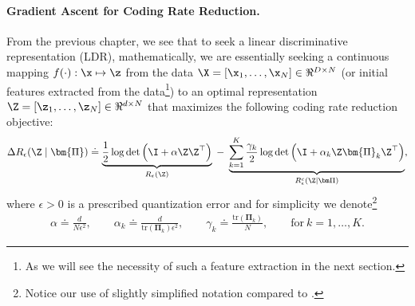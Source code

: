 \documentclass[../../book-main.tex]{subfiles}
\begin{document}
\paragraph{Gradient Ascent for Coding Rate Reduction.} From the previous chapter, we see that to seek a linear discriminative representation (LDR), mathematically, we are essentially seeking a continuous mapping $f(\cdot): \x \mapsto \z$ from the data $\X = [\x_1, \ldots, \x_N] \in \Re^{D \times N}$ (or initial features extracted from the data\footnote{As we will see the necessity of such a feature extraction in the next section.}) to an optimal representation $\Z = [\z_1, \ldots, \z_N] \in \Re^{d \times N}$ that maximizes the following coding rate reduction objective:
\begin{equation}\label{eq:mcr-formulation}
\begin{split}
\Delta R_{\epsilon}(\Z \mid \bm{\Pi}) \doteq \underbrace{\frac{1}{2}\log\det \Big(\I + {\alpha} \Z \Z^{\top} \Big)}_{R_{\epsilon}(\Z)} \;-\; \underbrace{\sum_{k=1}^{K}\frac{\gamma_{k}}{2} \log\det\Big(\I + {\alpha_{k}} \Z \bm{\Pi}_{k} \Z^{\top} \Big)}_{R_{\epsilon}^c(\Z \mid \bm \Pi)},
\end{split}
\end{equation}
where $\epsilon > 0$ is a prescribed quantization error and for simplicity we denote\footnote{Notice our use of slightly simplified notation compared to .}
\begin{align*}
    \alpha \doteq \frac{d}{N\epsilon^2}, \qquad \alpha_{k} \doteq \frac{d}{\mathrm{tr}(\bm{\Pi}_{k})\epsilon^2}, \qquad \gamma_{k} \doteq \frac{\mathrm{tr}(\bm{\Pi}_{k})}{N}, \qquad \text{for}\ k = 1,\ldots, K.
\end{align*}
\end{document}
